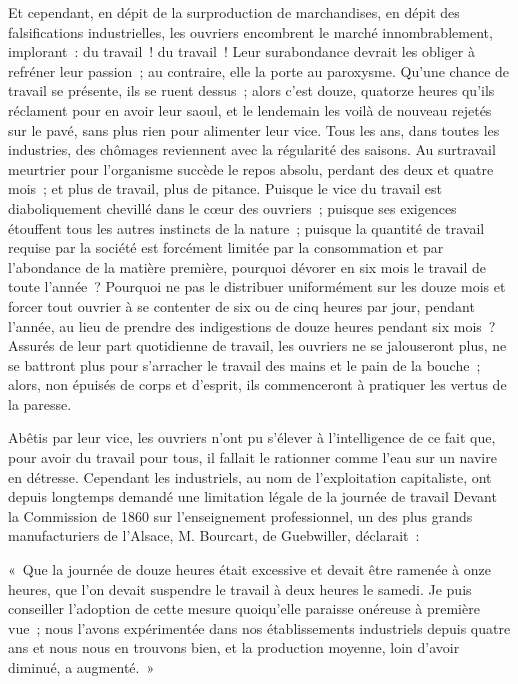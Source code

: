 \documentclass[french,twoside]{book} %
\newenvironment{quoteblock}%
  {\begin{quoting}}
  {\end{quoting}}
\newenvironment{quotebar}{%
    \def\FrameCommand{{\color{rubric!10!}\vrule width 0.5em} \hspace{0.9em}}%
    \def\OuterFrameSep{\itemsep} %
    \MakeFramed {\advance\hsize-\width \FrameRestore}
  }%
  {%
    \endMakeFramed
  }
\renewenvironment{quoteblock}%
  {%
    \savenotes
    \setstretch{0.9}
    \normalfont
    \begin{quotebar}
  }
  {%
    \end{quotebar}
    \spewnotes
  }
\begin{document}
Et cependant, en dépit de la surproduction de marchandises, en dépit des falsifications industrielles, les ouvriers encombrent le marché innombrablement, implorant : du travail ! du travail ! Leur surabondance devrait les obliger à refréner leur passion ; au contraire, elle la porte au paroxysme. Qu’une chance de travail se présente, ils se ruent dessus ; alors c’est douze, quatorze heures qu’ils réclament pour en avoir leur saoul, et le lendemain les voilà de nouveau rejetés sur le pavé, sans plus rien pour alimenter leur vice. Tous les ans, dans toutes les industries, des chômages reviennent avec la régularité des saisons. Au surtravail meurtrier pour l’organisme succède le repos absolu, perdant des deux et quatre mois ; et plus de travail, plus de pitance. Puisque le vice du travail est diaboliquement chevillé dans le cœur des ouvriers ; puisque ses exigences étouffent tous les autres instincts de la nature ; puisque la quantité de travail requise par la société est forcément limitée par la consommation et par l’abondance de la matière première, pourquoi dévorer en six mois le travail de toute l’année ? Pourquoi ne pas le distribuer uniformément sur les douze mois et forcer tout ouvrier à se contenter de six ou de cinq heures par jour, pendant l’année, au lieu de prendre des indigestions de douze heures pendant six mois ? Assurés de leur part quotidienne de travail, les ouvriers ne se jalouseront plus, ne se battront plus pour s’arracher le travail des mains et le pain de la bouche ; alors, non épuisés de corps et d’esprit, ils commenceront à pratiquer les vertus de la paresse.\par
Abêtis par leur vice, les ouvriers n’ont pu s’élever à l’intelligence de ce fait que, pour avoir du travail pour tous, il fallait le rationner comme l’eau sur un navire en détresse. Cependant les industriels, au nom de l’exploitation capitaliste, ont depuis longtemps demandé une limitation légale de la journée de travail Devant la Commission de 1860 sur l’enseignement professionnel, un des plus grands manufacturiers de l’Alsace, M. Bourcart, de Guebwiller, déclarait :\par

\begin{quoteblock}
 \noindent « Que la journée de douze heures était excessive et devait être ramenée à onze heures, que l’on devait suspendre le travail à deux heures le samedi. Je puis conseiller l’adoption de cette mesure quoiqu’elle paraisse onéreuse à première vue ; nous l’avons expérimentée dans nos établissements industriels depuis quatre ans et nous nous en trouvons bien, et la production moyenne, loin d’avoir diminué, a augmenté. »
\end{quoteblock}
\end{document}
